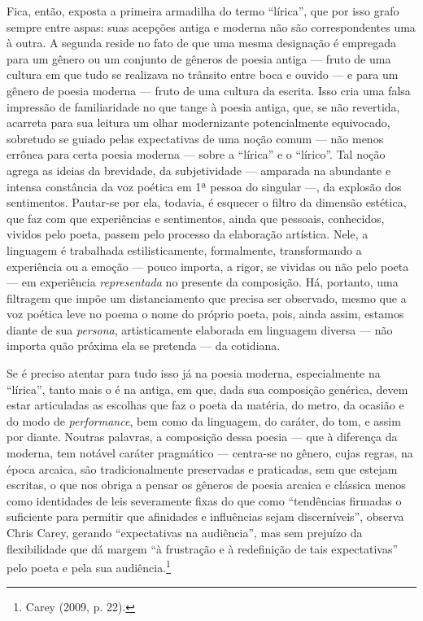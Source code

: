 Fica, então, exposta a primeira armadilha do termo “lírica”, que por isso grafo
sempre entre aspas: suas acepções antiga e moderna não são correspondentes uma
à outra. A segunda reside no fato de que uma mesma designação é empregada para
um gênero ou um conjunto de gêneros de poesia antiga --- fruto de uma cultura em
que tudo se realizava no trânsito entre boca e ouvido --- e para um gênero de
poesia moderna --- fruto de uma cultura da escrita. Isso cria uma falsa impressão
de familiaridade no que tange à poesia antiga, que, se não revertida, acarreta
para sua leitura um olhar modernizante potencialmente equivocado, sobretudo se
guiado pelas expectativas de uma noção comum --- não menos errônea para certa
poesia moderna --- sobre a “lírica” e o “lírico”. Tal noção agrega as ideias da
brevidade, da subjetividade --- amparada na abundante e intensa constância da voz
poética em 1ª pessoa do singular ---, da explosão dos sentimentos. Pautar-se por
ela, todavia, é esquecer o filtro da dimensão estética, que faz com que
experiências e sentimentos, ainda que pessoais, conhecidos, vividos pelo poeta,
passem pelo processo da elaboração artística. Nele, a linguagem é trabalhada
estilisticamente, formalmente, transformando a experiência ou a emoção --- pouco
importa, a rigor, se vividas ou não pelo poeta --- em experiência
\textit{representada} no presente da composição. Há, portanto, uma filtragem
que impõe um distanciamento que precisa ser observado, mesmo que a voz poética
leve no poema o nome do próprio poeta, pois, ainda assim, estamos diante de sua
\textit{persona}, artisticamente elaborada em linguagem diversa --- não importa
quão próxima ela se pretenda --- da cotidiana.

Se é preciso atentar para tudo isso já na poesia moderna, especialmente na
“lírica”, tanto mais o é na antiga, em que, dada sua composição genérica, devem
estar articuladas as escolhas que faz o poeta da matéria, do metro, da ocasião
e do modo de \textit{performance}, bem como da linguagem, do caráter, do tom, e
assim por diante. Noutras palavras, a composição dessa poesia --- que à diferença
da moderna, tem notável caráter pragmático --- centra-se no gênero, cujas regras,
na época arcaica, são tradicionalmente preservadas e praticadas, sem que
estejam escritas, o que nos obriga a pensar os gêneros de poesia arcaica e
clássica menos como identidades de leis severamente fixas do que como
“tendências firmadas o suficiente para permitir que afinidades e influências
sejam discerníveis”, observa Chris Carey, gerando
“expectativas na audiência”, mas sem prejuízo da flexibilidade que dá margem “à
frustração e à redefinição de tais expectativas” pelo poeta e pela sua
audiência.\footnote{ Carey (2009, p. 22).}

